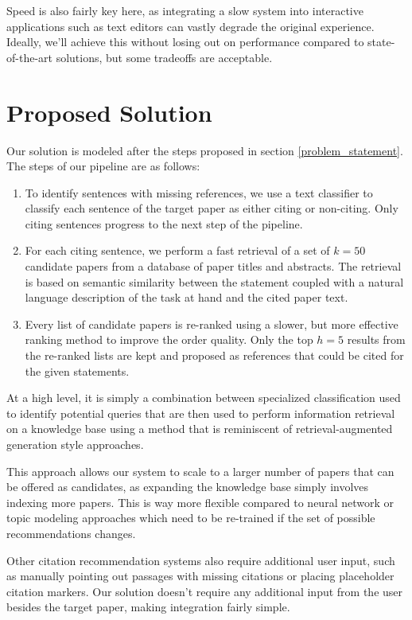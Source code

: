 \documentclass[12pt,a4paper]{report}
\begin{document}
Speed is also fairly key here, as integrating a slow system into interactive applications such as text editors can vastly degrade the original experience. Ideally, we'll achieve this without losing out on performance compared to state-of-the-art solutions, but some tradeoffs are acceptable.

\section{Proposed Solution} 

Our solution is modeled after the steps proposed in section \ref{problem_statement}. The steps of our pipeline are as follows:

\begin{enumerate}
    \item To identify sentences with missing references, we use a text classifier to classify each sentence of the target paper as either citing or non-citing. Only citing sentences progress to the next step of the pipeline.
    \item For each citing sentence, we perform a fast retrieval of a set of \(k=50\) candidate papers from a database of paper titles and abstracts. The retrieval is based on semantic similarity between the statement coupled with a natural language description of the task at hand and the cited paper text.
    \item Every list of candidate papers is re-ranked using a slower, but more effective ranking method to improve the order quality. Only the top \(h=5\) results from the re-ranked lists are kept and proposed as references that could be cited for the given statements.
\end{enumerate} 

At a high level, it is simply a combination between specialized classification used to identify potential queries that are then used to perform information retrieval on a knowledge base using a method that is reminiscent of retrieval-augmented generation \cite{Lewis2020RetrievalAugmentedGF} style approaches.

This approach allows our system to scale to a larger number of papers that can be offered as candidates, as expanding the knowledge base simply involves indexing more papers. This is way more flexible compared to neural network \cite{Jeong2019ACC} or topic modeling approaches \cite{He2010ContextawareCR} which need to be re-trained if the set of possible recommendations changes.

Other citation recommendation systems \cite{He2010ContextawareCR} also require additional user input, such as manually pointing out passages with missing citations or placing placeholder citation markers. Our solution doesn't require any additional input from the user besides the target paper, making integration fairly simple.
\end{document}
